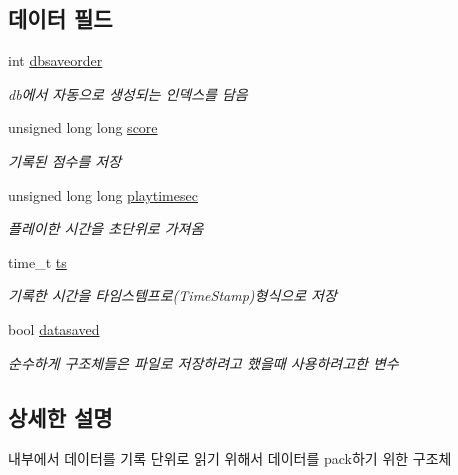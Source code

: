 \subsection*{데이터 필드}
\begin{DoxyCompactItemize}
\item 
int \hyperlink{struct_tetris_1_1_d_b_management_1_1_score_board_attributes_a8fcc24de440dcae3e369df28485cde4d}{dbsaveorder}
\begin{DoxyCompactList}\small\item\em db에서 자동으로 생성되는 인덱스를 담음 \end{DoxyCompactList}\item 
unsigned long long \hyperlink{struct_tetris_1_1_d_b_management_1_1_score_board_attributes_acca4d00875cd210845e3ed2532ed276a}{score}
\begin{DoxyCompactList}\small\item\em 기록된 점수를 저장 \end{DoxyCompactList}\item 
unsigned long long \hyperlink{struct_tetris_1_1_d_b_management_1_1_score_board_attributes_a1534fca0e7a2795c055de645cba2ea18}{playtimesec}
\begin{DoxyCompactList}\small\item\em 플레이한 시간을 초단위로 가져옴 \end{DoxyCompactList}\item 
time\+\_\+t \hyperlink{struct_tetris_1_1_d_b_management_1_1_score_board_attributes_a79b3c0fb31de1f4fd878b90695480b75}{ts}
\begin{DoxyCompactList}\small\item\em 기록한 시간을 타임스템프로(\+Time\+Stamp)형식으로 저장 \end{DoxyCompactList}\item 
bool \hyperlink{struct_tetris_1_1_d_b_management_1_1_score_board_attributes_a0ac70e57809cf25a2b6a4c224a951497}{datasaved}
\begin{DoxyCompactList}\small\item\em 순수하게 구조체들은 파일로 저장하려고 했을때 사용하려고한 변수 \end{DoxyCompactList}\end{DoxyCompactItemize}


\subsection{상세한 설명}
내부에서 데이터를 기록 단위로 읽기 위해서 데이터를 pack하기 위한 구조체 

